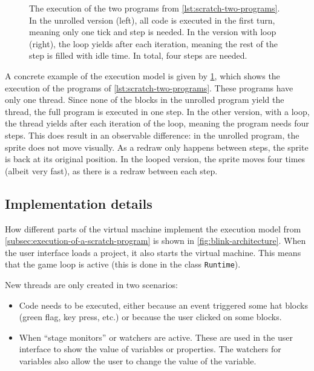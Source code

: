 \documentclass[../main]{subfiles}
\begin{document}
\begin{figure}
    \centering
    \begin{subfigure}{0.40\textwidth}
        
    \end{subfigure}
    \begin{subfigure}{0.59\textwidth}
        
    \end{subfigure}
    \caption{The execution of the two programs from \cref{lst:scratch-two-programs}. In the unrolled version (left), all code is executed in the first turn, meaning only one tick and step is needed. In the version with loop (right), the loop yields after each iteration, meaning the rest of the step is filled with idle time. In total, four steps are needed. }
    \label{fig:scratch-two-execution}
\end{figure}

A concrete example of the execution model is given by \cref{fig:scratch-two-execution}, which shows the execution of the programs of \cref{lst:scratch-two-programs}.
These programs have only one thread.
Since none of the blocks in the unrolled program yield the thread, the full program is executed in one step.
In the other version, with a loop, the thread yields after each iteration of the loop, meaning the program needs four steps.
This does result in an observable difference: in the unrolled program, the sprite does not move visually.
As a redraw only happens between steps, the sprite is back at its original position.
In the looped version, the sprite moves four times (albeit very fast), as there is a redraw between each step.

\subsection{Implementation details}\label{subsec:implementation-details}

How different parts of the virtual machine implement the execution model from \cref{subsec:execution-of-a-scratch-program} is shown in \cref{fig:blink-architecture}.
When the user interface loads a project, it also starts the virtual machine.
This means that the game loop is active (this is done in the class \texttt{Runtime}).

New threads are only created in two scenarios:
\begin{itemize}[noitemsep]
    \item Code needs to be executed, either because an event triggered some hat blocks (green flag, key press, etc.) or because the user clicked on some blocks.
    \item When ``stage monitors'' or watchers are active.
        These are used in the user interface to show the value of variables or properties.
        The watchers for variables also allow the user to change the value of the variable.
\end{itemize}
\end{document}
